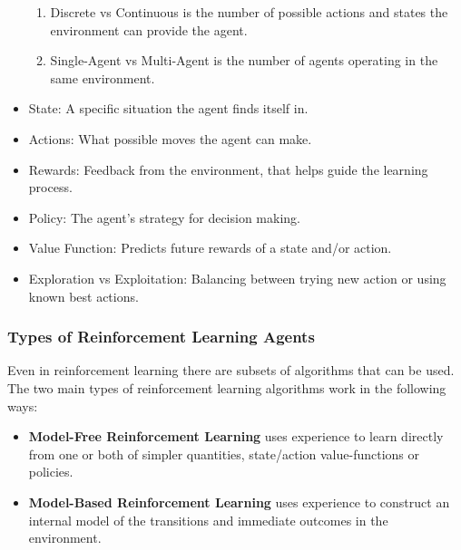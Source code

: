\begin{itemize}
\begin{enumerate}
                  \item Discrete vs Continuous is the number of possible actions and states the environment can provide the agent.
                  \item Single-Agent vs Multi-Agent is the number of agents operating in the same environment.
            \end{enumerate}
      \item State: A specific situation the agent finds itself in.
      \item Actions: What possible moves the agent can make.
      \item Rewards: Feedback from the environment, that helps guide the learning process.
      \item Policy: The agent's strategy for decision making.
      \item Value Function: Predicts future rewards of a state and/or action.
      \item Exploration vs Exploitation: Balancing between trying new action or using known best actions.
\end{itemize}


\subsubsection{Types of Reinforcement Learning Agents}
Even in reinforcement learning there are subsets of algorithms that can be used. The two main types of reinforcement learning algorithms work in the following ways:
\begin{itemize}
      \item \textbf{Model-Free Reinforcement Learning} uses experience to learn directly from one or both of simpler quantities, state/action value-functions or policies. %
      \item \textbf{Model-Based Reinforcement Learning} uses experience to construct an internal model of the transitions and immediate outcomes in the environment.
\end{itemize}

